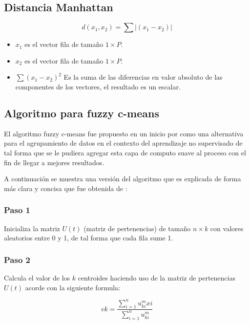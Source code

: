\documentclass[11pt, letterpaper]{article}
\begin{document}
\subsection{Distancia Manhattan}

$$d(x_1,x_2) = \sum{|(x_1-x_2)|}$$

\begin{itemize}
	\item $x_1$ es el vector fila de tamaño $1\times P$.
	\item $x_2$ es el vector fila de tamaño $1\times P$.
	\item $\sum{(x_1-x_2)^2}$ Es la suma de las diferencias en valor absoluto de las componentes de los vectores, el resultado es un escalar.
\end{itemize}


\newpage

\subsection{Algoritmo para fuzzy c-means}

El algoritmo fuzzy c-means fue propuesto en un inicio por \cite{nascimento_fuzzy_2000} como una alternativa para el agrupamiento de datos en el contexto del aprendizaje no supervisado de tal forma que se le pudiera agregar esta capa de computo suave al proceso con el fin de llegar a mejores resultados.

A continuación se muestra una versión del algoritmo que es explicada de forma más clara y concisa que fue obtenida de 
\cite{edla_analysis_2020}:

\subsubsection{Paso 1}

Inicializa la matriz $U(t)$ (matriz de pertenencias) de tamaño $n\times k$ con valores aleatorios entre 0 y 1, de tal forma que cada fila sume 1.

\subsubsection{Paso 2}

Calcula el valor de los $k$ centroides haciendo uso de la matriz de pertenencias $U(t)$ acorde con la siguiente formula:

$$vk = \frac{\sum^n_{i = 1}{u^m_{ki}xi}}{\sum^n_{i = 1}{u^m_{ki}}}$$
\end{document}
